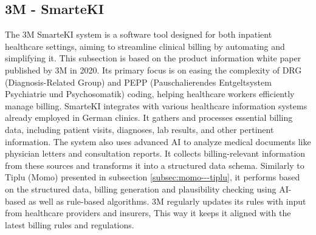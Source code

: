 \subsection{3M - SmarteKI}\label{subsec:3m---smarteki}
The 3M SmarteKI system is a software tool designed for both inpatient healthcare settings, aiming to streamline clinical billing by automating and simplifying it.
This subsection is based on the product information white paper published by 3M in 2020\cite{3mSmarteKI}.
Its primary focus is on easing the complexity of DRG (Diagnosis-Related Group) and PEPP (Pauschalierendes Entgeltsystem Psychiatrie und Psychosomatik) coding, helping healthcare workers efficiently manage billing.
SmarteKI integrates with various healthcare information systems already employed in German clinics.
It gathers and processes essential billing data, including patient visits, diagnoses, lab results, and other pertinent information.
The system also uses advanced AI to analyze medical documents like physician letters and consultation reports.
It collects billing-relevant information from these sources and transforms it into a structured data schema.
Similarly to Tiplu (Momo) presented in subsection \ref{subsec:momo---tiplu}, it performs based on the structured data, billing generation and plausibility checking using AI-based as well as rule-based algorithms.
3M regularly updates its rules with input from healthcare providers and insurers,
This way it keeps it aligned with the latest billing rules and regulations.
